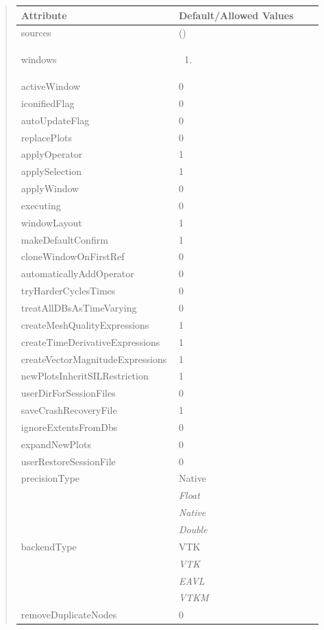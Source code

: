 \documentclass[letterpaper,10pt,english]{sphinxmanual}
\begin{document}
\begin{quote}
\begin{longtable}{|p{0.475\linewidth}|p{0.475\linewidth}|}
\textbf{Attribute}
 & 
\textbf{Default/Allowed Values}
\\
\hline
sources
 & 
()
\\
\hline
windows
 & \begin{enumerate}
\item {} 
\end{enumerate}
\\
\hline
activeWindow
 & 
0
\\
\hline
iconifiedFlag
 & 
0
\\
\hline
autoUpdateFlag
 & 
0
\\
\hline
replacePlots
 & 
0
\\
\hline
applyOperator
 & 
1
\\
\hline
applySelection
 & 
1
\\
\hline
applyWindow
 & 
0
\\
\hline
executing
 & 
0
\\
\hline
windowLayout
 & 
1
\\
\hline
makeDefaultConfirm
 & 
1
\\
\hline
cloneWindowOnFirstRef
 & 
0
\\
\hline
automaticallyAddOperator
 & 
0
\\
\hline
tryHarderCyclesTimes
 & 
0
\\
\hline
treatAllDBsAsTimeVarying
 & 
0
\\
\hline
createMeshQualityExpressions
 & 
1
\\
\hline
createTimeDerivativeExpressions
 & 
1
\\
\hline
createVectorMagnitudeExpressions
 & 
1
\\
\hline
newPlotsInheritSILRestriction
 & 
1
\\
\hline
userDirForSessionFiles
 & 
0
\\
\hline
saveCrashRecoveryFile
 & 
1
\\
\hline
ignoreExtentsFromDbs
 & 
0
\\
\hline
expandNewPlots
 & 
0
\\
\hline
userRestoreSessionFile
 & 
0
\\
\hline
precisionType
 & 
Native
\\
\hline & 
\emph{Float}
\\
\hline & 
\emph{Native}
\\
\hline & 
\emph{Double}
\\
\hline
backendType
 & 
VTK
\\
\hline & 
\emph{VTK}
\\
\hline & 
\emph{EAVL}
\\
\hline & 
\emph{VTKM}
\\
\hline
removeDuplicateNodes
 & 
0
\\
\hline\end{longtable}

\end{quote}
\end{document}
